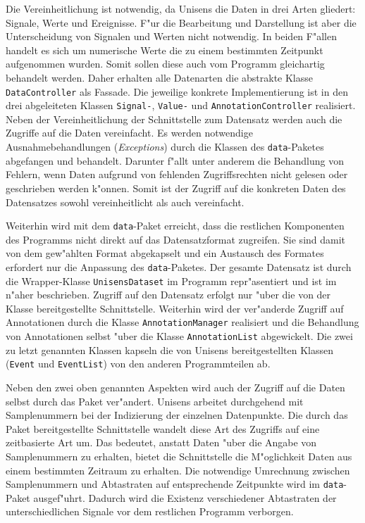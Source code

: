 Die Vereinheitlichung ist notwendig, da Unisens die Daten in drei Arten gliedert: Signale, Werte und Ereignisse.
F"ur die Bearbeitung und Darstellung ist aber die Unterscheidung von Signalen und Werten nicht notwendig.
In beiden F"allen handelt es sich um numerische Werte die zu einem bestimmten Zeitpunkt aufgenommen wurden.
Somit sollen diese auch vom Programm gleichartig behandelt werden.
Daher erhalten alle Datenarten die abstrakte Klasse \verb|DataController| als Fassade.
Die jeweilige konkrete Implementierung ist in den drei abgeleiteten Klassen \verb|Signal-|, \verb|Value-| und \verb|AnnotationController| realisiert.
Neben der Vereinheitlichung der Schnittstelle zum Datensatz werden auch die Zugriffe auf die Daten vereinfacht.
Es werden notwendige Ausnahmebehandlungen (\emph{Exceptions}) durch die Klassen des \verb|data|-Paketes abgefangen und behandelt.
Darunter f"allt unter anderem die Behandlung von Fehlern, wenn Daten aufgrund von fehlenden Zugriffsrechten nicht gelesen oder geschrieben werden k"onnen.
Somit ist der Zugriff auf die konkreten Daten des Datensatzes sowohl vereinheitlicht als auch vereinfacht.

Weiterhin wird mit dem \verb|data|-Paket erreicht, dass die restlichen Komponenten des Programms nicht direkt auf das Datensatzformat zugreifen.
Sie sind damit von dem gew"ahlten Format abgekapselt und ein Austausch des Formates erfordert nur die Anpassung des \verb|data|-Paketes.
Der gesamte Datensatz ist durch die Wrapper-Klasse \verb|UnisensDataset| im Programm repr"asentiert und ist im  n"aher beschrieben.
Zugriff auf den Datensatz erfolgt nur "uber die von der Klasse bereitgestellte Schnittstelle.
Weiterhin wird der ver"anderde Zugriff auf Annotationen durch die Klasse \verb|AnnotationManager| realisiert und die Behandlung von Annotationen selbst "uber die Klasse \verb|AnnotationList| abgewickelt.
Die zwei zu letzt genannten Klassen kapseln die von Unisens bereitgestellten Klassen (\verb|Event| und \verb|EventList|) von den anderen Programmteilen ab.

Neben den zwei oben genannten Aspekten wird auch der Zugriff auf die Daten selbst durch das Paket ver"andert.
Unisens arbeitet durchgehend mit Samplenummern bei der Indizierung der einzelnen Datenpunkte.
Die durch das Paket bereitgestellte Schnittstelle wandelt diese Art des Zugriffs auf eine zeitbasierte Art um.
Das bedeutet, anstatt Daten "uber die Angabe von Samplenummern zu erhalten, bietet die Schnittstelle die M"oglichkeit Daten aus einem bestimmten Zeitraum zu erhalten.
Die notwendige Umrechnung zwischen Samplenummern und Abtastraten auf entsprechende Zeitpunkte wird im \verb|data|-Paket ausgef"uhrt.
Dadurch wird die Existenz verschiedener Abtastraten der unterschiedlichen Signale vor dem restlichen Programm verborgen.

